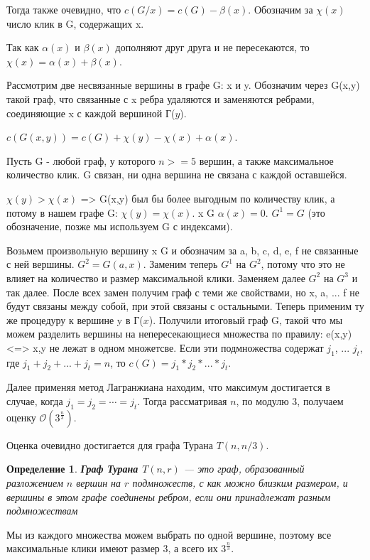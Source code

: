 \documentclass{article}
\newtheorem{theorem}{Определение}
\begin{document}
Тогда также очевидно, что $c(G/x) = c(G) - \beta(x)$. Обозначим за $\chi(x)$ число клик в G, содержащих x.

Так как $\alpha(x)$ и $\beta(x)$ дополняют друг друга и не пересекаются, то $\chi(x) =\alpha(x) + \beta(x)$.

Рассмотрим две несвязанные вершины в графе G: x и y. Обозначим через G(x,y) такой граф, что связанные с x ребра удаляются и заменяются ребрами, соединяющие x с каждой вершиной Г($y$).

$c(G(x, y)) = c(G) + \chi(y) - \chi(x) + \alpha(x)$.

Пусть G - любой граф, у которого $n >= 5$ вершин, а также максимальное количество клик. G связан, ни одна вершина не связана с каждой оставшейся.

$\chi(y) > \chi(x)$ => G(x,y) был бы более выгодным по количеству клик, а потому в нашем графе G: $\chi(y) = \chi(x)$. \forall x \in G $\alpha(x) = 0$. $G^{1} = G$ (это обозначение, позже мы используем G с индексами).

Возьмем произвольную вершину x \in G и обозначим за a, b, c, d, e, f не связанные с ней вершины. $G^{2} = G(a, x)$. Заменим теперь $G^{1}$ на $G^{2}$, потому что это не влияет на количество и размер максимальной клики. Заменяем далее $G^{2}$ на $G^{3}$ и так далее. После всех замен получим граф с теми же свойствами, но x, a, ... f не будут связаны между собой, при этой связаны с остальными. Теперь применим ту же процедуру к вершине y в Г($x$). Получили итоговый граф G, такой что мы можем разделить вершины на непересекающиеся множества по правилу: \exists e(x,y) <=> x,y не лежат в одном множетсве. Если эти подмножества содержат $j_1$, ... $j_t$, где $j_1 + j_2 + ... + j_t = n$, то $c(G) = j_1 * j_2 * ... * j_t$.

Далее применяя метод Лагранжиана находим, что максимум достигается в случае, когда $j_1=j_2=\cdots=j_t$. Тогда рассматривая $n$, по модулю $3$, получаем оценку $\mathcal{O}(3^\frac{n}{3})$.

Оценка очевидно достигается для графа Турана $T(n, n/3)$.
\begin{theorem}
\textbf{Граф Турана $T(n,r)$ }— это граф, образованный разложением $n$ вершин на $r$ подмножеств, с как можно близким размером, и вершины в этом графе соединены ребром, если они принадлежат разным подмножествам
\end{theorem} \newline
Мы из каждого множества можем выбрать по одной вершине, поэтому все максимальные клики имеют размер $3$, а всего их $3^\frac{n}{3}$.
\end{document}
